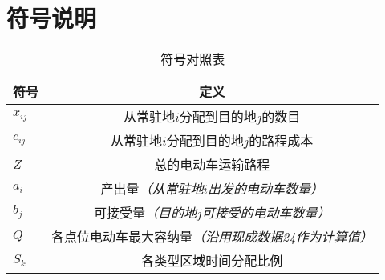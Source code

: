 \section{符号说明}
\begin{table}[H]
\begin{center}
\caption{符号对照表}
\begin{tabular}{p{3cm}<{\centering} |c}

\toprule[1.75pt]
    符号 & 定义\\
\midrule[1pt]
    $x_{ij}$  & 从常驻地$i$分配到目的地$j$的数目    \\
    $c_{ij}$  & 从常驻地$i$分配到目的地$j$的路程成本 \\
    $Z$       & 总的电动车运输路程\\
    $a_{i}$   & 产出量\textit{（从常驻地$i$出发的电动车数量）}\\
    $b_{j}$   & 可接受量\textit{（目的地$j$可接受的电动车数量）}\\
    $Q$       & 各点位电动车最大容纳量\textit{（沿用现成数据24作为计算值）}\\
    $S_{k}$   &各类型区域时间分配比例\\
\bottomrule[1.75pt]

\end{tabular}

\end{center}
\end{table}